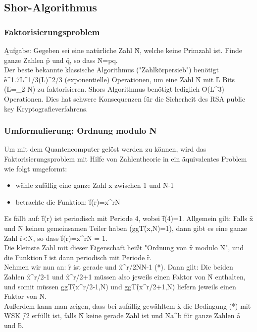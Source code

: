 \subsection{Shor-Algorithmus}
\subsubsection{Faktorisierungsproblem}
\b{Aufgabe:} Gegeben sei eine natürliche Zahl \f{N}, welche keine Primzahl ist. Finde ganze Zahlen \f{p} und \f{q}, so dass \f{N=pq}.\\[0.5em]
Der beste bekannte klassische Algorithmus ("Zahlkörpersieb") benötigt \f{e^{1.7L^{1/3}(\ln L)^{2/3}}} (exponentielle) Operationen, um eine Zahl \f{N} mit \f{L} Bits (\f{L=\log_2 N}) zu faktorisieren. Shors Algorithmus benötigt lediglich \f{O(L^3)} Operationen. Dies hat schwere Konsequenzen für die Sicherheit des RSA public key Kryptografieverfahrens.

\subsubsection{Umformulierung: Ordnung modulo N}
Um mit dem Quantencomputer gelöst werden zu können, wird das Faktorisierungsproblem mit Hilfe von Zahlentheorie in ein äquivalentes Problem wie folgt umgeformt:
\begin{itemize}
    \item wähle zufällig eine ganze Zahl x zwischen 1 und \f{N-1}
    \item betrachte die Funktion: \f{f(r)=x^r\mod N}
\end{itemize}
Es fällt auf: \f{f(r)} ist periodisch mit Periode 4, wobei \f{f(4)=1}. Allgemein gilt: Falls \f{x} und \f{N} keinen gemeinsamen Teiler haben (ggT\f{(x,N)=1}), dann gibt es eine ganze Zahl \f{r<N}, so dass \f{f(r)=x^r\mod N = 1}.\\
Die kleinste Zahl mit dieser Eigenschaft heißt "Ordnung von \f{x} modulo \f{N}", und die Funktion \f{f} ist dann periodisch mit Periode \f{r}.\\

Nehmen wir nun an: \f{r} ist gerade und \f{x^{r/2}\mod N\neq N-1} (*). Dann gilt:
Die beiden Zahlen \f{x^{r/2}-1} und \f{x^{r/2}+1} müssen also jeweils einen Faktor von \f{N} enthalten, und somit müssen ggT\f{(x^{r/2}-1,N)} und ggT\f{(x^{r/2}+1,N)} liefern jeweils einen Faktor von \f{N}.\\
Außerdem kann man zeigen, dass bei zufällig gewähltem \f{x} die Bedingung (*) mit WSK \f{/2} erfüllt ist, falls \f{N} keine gerade Zahl ist und \f{N\neq a^b} für ganze Zahlen \f{a} und \f{b}.\\

